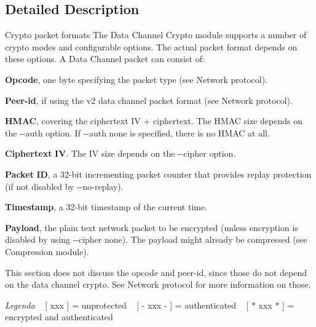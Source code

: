 \subsection{Detailed Description}
\begin{DoxyParagraph}{Crypto packet formats}
The Data Channel Crypto module supports a number of crypto modes and configurable options. The actual packet format depends on these options. A Data Channel packet can consist of\+:
\begin{DoxyItemize}
\item {\bfseries Opcode}, one byte specifying the packet type (see Network protocol).
\item {\bfseries Peer-\/id}, if using the v2 data channel packet format (see Network protocol).
\item {\bfseries H\+M\+A\+C}, covering the ciphertext I\+V + ciphertext. The H\+M\+A\+C size depends on the {\ttfamily -\/-\/auth} option. If {\ttfamily -\/-\/auth} {\ttfamily none} is specified, there is no H\+M\+A\+C at all.
\item {\bfseries Ciphertext} {\bfseries I\+V}. The I\+V size depends on the {\ttfamily -\/-\/cipher} option.
\item {\bfseries Packet} {\bfseries I\+D}, a 32-\/bit incrementing packet counter that provides replay protection (if not disabled by {\ttfamily -\/-\/no-\/replay}).
\item {\bfseries Timestamp}, a 32-\/bit timestamp of the current time.
\item {\bfseries Payload}, the plain text network packet to be encrypted (unless encryption is disabled by using {\ttfamily -\/-\/cipher} {\ttfamily none}). The payload might already be compressed (see Compression module).
\end{DoxyItemize}
\end{DoxyParagraph}
\begin{DoxyParagraph}{}
This section does not discuss the opcode and peer-\/id, since those do not depend on the data channel crypto. See Network protocol for more information on those.
\end{DoxyParagraph}
\begin{DoxyParagraph}{}
{\itshape Legenda} ~\newline
{\ttfamily \mbox{[} xxx \mbox{]}} = unprotected ~\newline
{\ttfamily \mbox{[} -\/ xxx -\/ \mbox{]}} = authenticated ~\newline
{\ttfamily \mbox{[} $\ast$ xxx $\ast$ \mbox{]}} = encrypted and authenticated
\end{DoxyParagraph}
